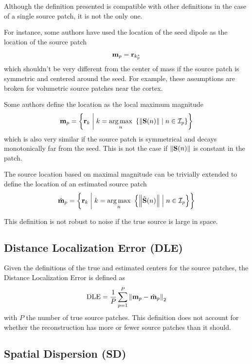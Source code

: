 Although the definition presented is compatible with other definitions in the case of a single source patch, it is not the only one.

For instance, some authors have used the location of the seed dipole as the location of the source patch
\begin{equation}
    {\mathbf{m}}_p = \mathbf{r}_{k_p^*}
\end{equation}
which shouldn't be very different from the center of mass if the source patch is symmetric and centered around the seed.
%
For example, these assumptions are broken for volumetric source patches near the cortex.

Some authors define the location as the local maximum magnitude
\begin{equation}
    {\mathbf{m}}_p = \left\{ \mathbf{r}_k \;\middle|\; k = \operatorname*{arg\,max}_n\,\,
    \left\{ \left\lVert \mathbf{S}(n) \right\rVert \;\middle|\; n\in \mathcal{I}_p  \right\}
     \right\}
\end{equation}
which is also very similar if the source patch is symmetrical and decays monotonically far from the seed.
%
This is not the case if $\left\lVert \mathbf{S}(n) \right\rVert$ is constant in the patch.

The source location based on maximal magnitude can be trivially extended to define the location of an estimated source patch
\begin{equation}
    \hat{\mathbf{m}}_p = \left\{ \mathbf{r}_k \;\middle|\; k = \operatorname*{arg\,max}_n\,\,
    \left\{ \left\lVert \hat{\mathbf{S}}(n) \right\rVert \;\middle|\; n\in \mathcal{I}_p  \right\}
     \right\}
\end{equation}

This definition is not robust to noise if the true source is large in space.

\subsection{Distance Localization Error (DLE)}

Given the definitions of the true and estimated centers for the source patches, the Distance Localization Error is defined as
\begin{equation}
\text{DLE} = 
\frac{1}{P} \sum_{p=1}^P \left\lVert  \mathbf{m}_p - \hat{\mathbf{m}}_p  \right\rVert_2
\label{def:DLE}
\end{equation}
with $P$ the number of true source patches.
%
This definition does not account for whether the reconstruction has more or fewer source patches than it should.

\subsection{Spatial Dispersion (SD)}

